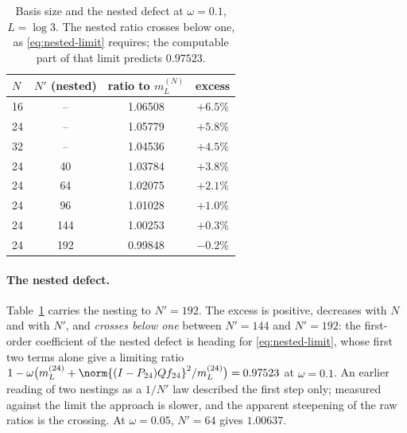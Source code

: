 \begin{table}[ht]\centering\small
\caption{Basis size and the nested defect at $\omega=0.1$, $L=\log3$. The
nested ratio crosses below one, as \eqref{eq:nested-limit} requires; the
computable part of that limit predicts $0.97523$.}\label{tab:nested}
\begin{tabular}{@{}lccc@{}}
\toprule
$N$ & $N'$ (nested) & ratio to $m_L^{(N)}$ & excess\\
\midrule
16 & -- & 1.06508 & $+6.5\%$\\
24 & -- & 1.05779 & $+5.8\%$\\
32 & -- & 1.04536 & $+4.5\%$\\
24 & 40 & 1.03784 & $+3.8\%$\\
24 & 64 & 1.02075 & $+2.1\%$\\
24 & 96 & 1.01028 & $+1.0\%$\\
24 & 144 & 1.00253 & $+0.3\%$\\
24 & 192 & 0.99848 & $-0.2\%$\\
\bottomrule
\end{tabular}
\end{table}

\paragraph{The nested defect.} Table~\ref{tab:nested} carries the nesting to
$N'=192$. The excess is positive, decreases with $N$ and with $N'$, and
\emph{crosses below one} between $N'=144$ and $N'=192$: the first-order
coefficient of the nested defect is heading for \eqref{eq:nested-limit}, whose
first two terms alone give a limiting ratio
$1-\omega\big(m_L^{(24)}+\norm{(I-P_{24})Qf_{24}}^2/m_L^{(24)}\big)=0.97523$ at
$\omega=0.1$. An earlier reading of two nestings as a $1/N'$ law
\cite{ContractionNote} described the first step only; measured against the
limit the approach is slower, and the apparent steepening of the raw ratios is
the crossing. At $\omega=0.05$, $N'=64$ gives $1.00637$.

